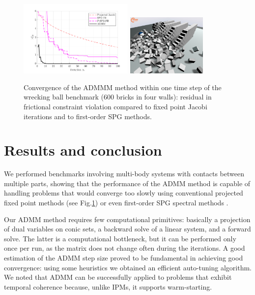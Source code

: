 \documentclass{svproc}
\begin{document}
\begin{figure}[h!]
\centering
\includegraphics[width=0.50\textwidth]{t8_convergence.pdf}
\includegraphics[width=0.35\textwidth, trim=0cm -3cm 0 3cm]{t8_snapshot.png}
\caption{Convergence of the ADMMM method within one time step of the wrecking ball benchmark (600 bricks in four walls): residual in frictional constraint violation compared to fixed point Jacobi iterations and to first-order SPG methods.}
\label{fig:t8}
\end{figure}



\section{Results and conclusion}

We performed benchmarks involving multi-body systems with contacts between multiple parts, showing that the performance of the ADMM method is capable of handling problems that would converge too slowly using conventional projected fixed point methods (see Fig.\ref{fig:t8}) or even first-order SPG spectral methods \cite{heynIJNME2013}.

Our ADMM method requires few computational primitives: basically a projection of dual variables on conic sets, a backward solve of a linear system, and a forward solve. The latter is a computational bottleneck, but it can be performed only once per run, as the matrix does not change often during the iterations. 
A good estimation of the ADMM step size proved to be fundamental in achieving good convergence: using some heuristics we obtained an efficient auto-tuning algorithm. 
We noted that ADMM can be successfully applied to problems that exhibit temporal coherence because, unlike IPMs, it supports warm-starting.




\end{document}
